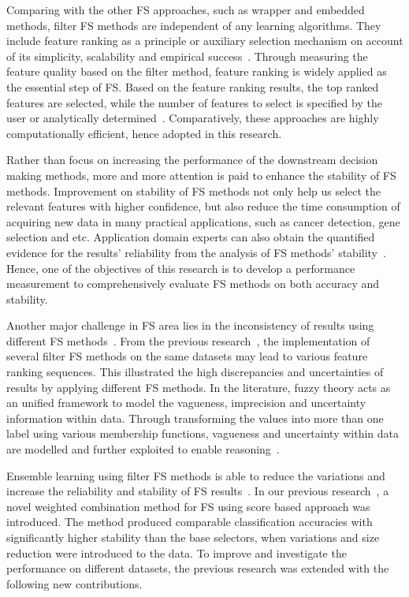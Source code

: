 \documentclass[conference]{IEEEtran}
\begin{document}
Comparing with the other FS approaches, such as wrapper and embedded methods, filter FS methods are independent of any learning algorithms. They include feature ranking as a principle or auxiliary selection mechanism on account of its simplicity, scalability and empirical success~\cite{guyon2003introduction}. Through measuring the feature quality based on the filter method, feature ranking is widely applied as the essential step of FS. Based on the feature ranking results, the top ranked features are selected, while the number of features to select is specified by the user or analytically determined~\cite{stoppiglia2003ranking}. Comparatively, these approaches are highly computationally efficient, hence adopted in this research.

Rather than focus on increasing the performance of the downstream decision making methods, more and more attention is paid to enhance the stability of FS methods. Improvement on stability of FS methods not only help us select the relevant features with higher confidence, but also reduce the time consumption of acquiring new data in many practical applications, such as cancer detection, gene selection and etc. Application domain experts can also obtain the quantified evidence for the results' reliability from the analysis of FS methods' stability~\cite{shen2019novel}. Hence, one of the objectives of this research is to develop a performance measurement to comprehensively evaluate FS methods on both accuracy and stability.

Another major challenge in FS area lies in the inconsistency of results using different FS methods~\cite{kamalov2017feature}. From the previous research~\cite{shen2019novel}, the implementation of several filter FS methods on the same datasets may lead to various feature ranking sequences. This illustrated the high discrepancies and uncertainties of results by applying different FS methods. In the literature, fuzzy theory acts as an unified framework to model the vagueness, imprecision and uncertainty information within data. Through transforming the values into more than one label using various membership functions, vagueness and uncertainty within data are modelled and further exploited to enable reasoning~\cite{jensen2005combining}.

Ensemble learning using filter FS methods is able to reduce the variations and increase the reliability and stability of FS results~\cite{kamalov2017feature}. In our previous research~\cite{shen2019novel}, a novel weighted combination method for FS using score based approach was introduced. The method produced comparable classification accuracies with significantly higher stability than the base selectors, when variations and size reduction were introduced to the data. To improve and investigate the performance on different datasets, the previous research was extended with the following new contributions.
\end{document}
